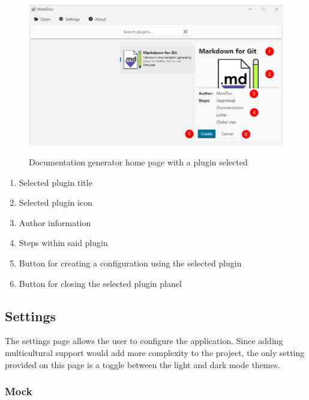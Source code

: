 \begin{figure}[H]
    \caption{Documentation generator home page with a plugin selected}
    \includegraphics[width=\linewidth]{img/markDocPluginSelected.png}
    \label{fig:homePagePluginSelected}
\end{figure}

\begin{enumerate}
    \item Selected plugin title
    \item Selected plugin icon
    \item Author information
    \item Steps within said plugin
    \item Button for creating a configuration using the selected plugin
    \item Button for closing the selected plugin planel
\end{enumerate}

\subsection{Settings}

The settings page allows the user to configure the application. Since adding multicultural support would add more complexity to the project, the only setting provided on this page is a toggle between the light and dark mode themes.

\subsubsection{Mock}

